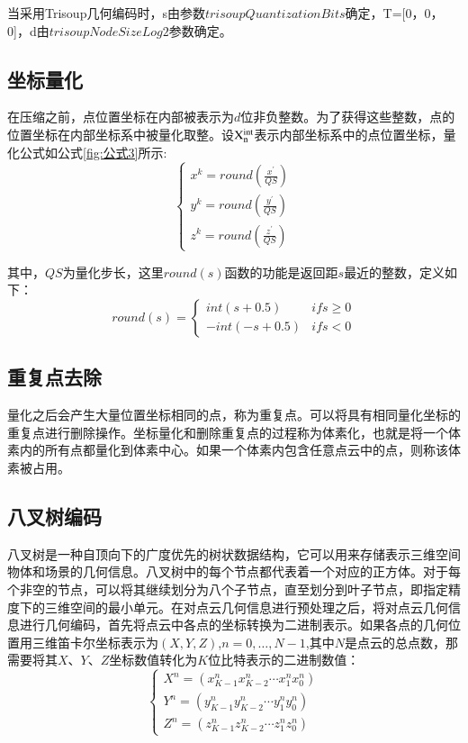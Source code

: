 \documentclass[bachelor,print,msfonts]{xduthesis}
\begin{document}
当采用Trisoup几何编码时，s由参数$trisoupQuantizationBits$确定，T=[0，0，0]，d由$trisoupNodeSizeLog2$参数确定。

\subsection{坐标量化}
在压缩之前，点位置坐标在内部被表示为$d$位非负整数。为了获得这些整数，点的位置坐标在内部坐标系中被量化取整。设${\rm{X}}_{\rm{n}}^{{\mathop{\rm int}}}$表示内部坐标系中的点位置坐标，量化公式如公式\ref{fig:公式3}所示:
\begin{equation}
    \left\{\begin{array}{l}
        x^{k}={round}\left(\frac{{x}^{\prime}}{Q S}\right) \\
        y^{k}={round}\left(\frac{y^{\prime}}{Q S}\right)   \\
        z^{k}={round}\left(\frac{{z}^{\prime}}{Q S}\right)
    \end{array}\right.
    \label{fig:公式3}
\end{equation}

其中，$QS$为量化步长，这里$round(s)$函数的功能是返回距$s$最近的整数，定义如下：
\begin{equation}
    {round}(s)=\left\{\begin{array}{cc}
        {int}(s+0.5)   & { if } s \geq 0 \\
        -{int}(-s+0.5) & { if } s<0
    \end{array}\right.
\end{equation}

\subsection{重复点去除}
量化之后会产生大量位置坐标相同的点，称为重复点。可以将具有相同量化坐标的重复点进行删除操作。坐标量化和删除重复点的过程称为体素化，也就是将一个体素内的所有点都量化到体素中心。如果一个体素内包含任意点云中的点，则称该体素被占用。

\subsection{八叉树编码}
八叉树是一种自顶向下的广度优先的树状数据结构，它可以用来存储表示三维空间物体和场景的几何信息。八叉树中的每个节点都代表着一个对应的正方体。对于每个非空的节点，可以将其继续划分为八个子节点，直至划分到叶子节点，即指定精度下的三维空间的最小单元。在对点云几何信息进行预处理之后，将对点云几何信息进行几何编码，首先将点云中各点的坐标转换为二进制表示。如果各点的几何位置用三维笛卡尔坐标表示为$(X,Y,Z)$,$n=0, …, N-1$,其中$N$是点云的总点数，那需要将其$X、Y、Z$坐标数值转化为$K$位比特表示的二进制数值：
\begin{equation}
    \left\{\begin{array}{l}
        X^{n}=\left(x_{K-1}^{n} x_{K-2}^{n} \cdots x_{1}^{n} x_{0}^{n}\right) \\
        Y^{n}=\left(y_{K-1}^{n} y_{K-2}^{n} \cdots y_{1}^{n} y_{0}^{n}\right) \\
        Z^{n}=\left(z_{K-1}^{n} z_{K-2}^{n} \cdots z_{1}^{n} z_{0}^{n}\right)
    \end{array}\right.
\end{equation}
\end{document}
